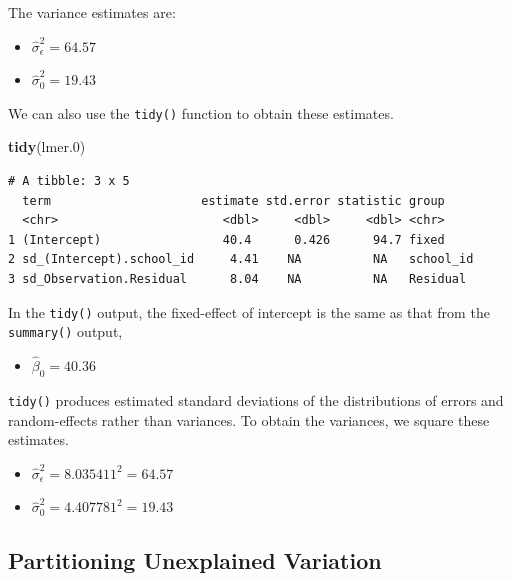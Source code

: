 \documentclass[]{book}
\newenvironment{Shaded}{\begin{snugshade}}{\end{snugshade}}
\newcommand{\FloatTok}[1]{\textcolor[rgb]{0.00,0.00,0.81}{#1}}
\newcommand{\KeywordTok}[1]{\textcolor[rgb]{0.13,0.29,0.53}{\textbf{#1}}}
\newcommand{\NormalTok}[1]{#1}
\providecommand{\tightlist}{%
  \setlength{\itemsep}{0pt}\setlength{\parskip}{0pt}}
\begin{document}
The variance estimates are:

\begin{itemize}
\tightlist
\item
  \(\hat\sigma^2_{\epsilon} = 64.57\)
\item
  \(\hat\sigma^2_0 = 19.43\)
\end{itemize}

We can also use the \texttt{tidy()} function to obtain these estimates.

\begin{Shaded}
\begin{Highlighting}[]
\KeywordTok{tidy}\NormalTok{(lmer}\FloatTok{.0}\NormalTok{)}
\end{Highlighting}
\end{Shaded}

\begin{verbatim}
# A tibble: 3 x 5
  term                     estimate std.error statistic group    
  <chr>                       <dbl>     <dbl>     <dbl> <chr>    
1 (Intercept)                 40.4      0.426      94.7 fixed    
2 sd_(Intercept).school_id     4.41    NA          NA   school_id
3 sd_Observation.Residual      8.04    NA          NA   Residual 
\end{verbatim}

In the \texttt{tidy()} output, the fixed-effect of intercept is the same as that from the \texttt{summary()} output,

\begin{itemize}
\tightlist
\item
  \(\hat\beta_0 = 40.36\)
\end{itemize}

\texttt{tidy()} produces estimated standard deviations of the distributions of errors and random-effects rather than variances. To obtain the variances, we square these estimates.

\begin{itemize}
\tightlist
\item
  \(\hat\sigma^2_{\epsilon} = 8.035411 ^2 = 64.57\)
\item
  \(\hat\sigma^2_0 = 4.407781^2 = 19.43\)
\end{itemize}

\hypertarget{partitioning-unexplained-variation}{%
\subsection{Partitioning Unexplained Variation}\label{partitioning-unexplained-variation}}
\end{document}
